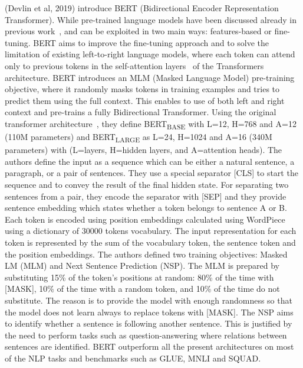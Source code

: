 (Devlin et al, 2019) \cite{devlin2018bert} introduce BERT (Bidirectional Encoder Representation Transformer). 
While pre-trained language models have been discussed already in previous work~\cite{radford2018improving}, and can be exploited in two main ways: features-based or fine-tuning. 
BERT aims to improve the fine-tuning approach and to solve the limitation of existing left-to-right language models, where each token can attend only to previous tokens in the self-attention layers~\cite{vaswani2017attention} of the Transformers architecture. 
BERT introduces an MLM (Masked Language Model) pre-training objective, where it randomly masks tokens in training examples and tries to predict them using the full context. This enables to use of both left and right context and pre-trains a fully Bidirectional Transformer.
Using the original transformer architecture~\cite{vaswani2017attention}, they define BERT\textsubscript{BASE} with L=12, H=768 and A=12 (110M parameters) and BERT\textsubscript{LARGE} as L=24, H=1024 and A=16 (340M parameters) with (L=layers, H=hidden layers, and A=attention heads).
The authors define the input as a sequence which can be either a natural sentence, a paragraph, or a pair of sentences. They use a special separator [CLS] to start the sequence and to convey the result of the final hidden state. For separating two sentences from a pair, they encode the separator with [SEP] and they provide sentence embedding which states whether a token belongs to sentence A or B. 
Each token is encoded using position embeddings calculated using WordPiece using a dictionary of 30000 tokens vocabulary. 
The input representation for each token is represented by the sum of the vocabulary token, the sentence token and the position embeddings. 
The authors defined two training objectives: Masked LM (MLM) and Next Sentence Prediction (NSP). 
The MLM is prepared by substituting 15\% of the token's positions at random: 80\% of the time with [MASK], 10\% of the time with a random token, and 10\% of the time do not substitute. The reason is to provide the model with enough randomness so that the model does not learn always to replace tokens with [MASK]. 
The NSP aims to identify whether a sentence is following another sentence. This is justified by the need to perform tasks such as question-answering where relations between sentences are identified. 
BERT outperform all the present architectures on most of the NLP tasks and benchmarks such as GLUE, MNLI and SQUAD. 


